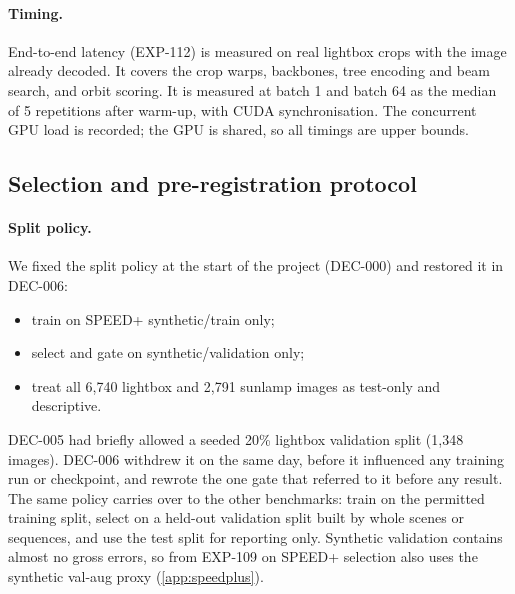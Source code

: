 \paragraph{Timing.}
End-to-end latency (EXP-112) is measured on real lightbox crops with the image already decoded. It covers the crop warps, backbones, tree encoding and beam search, and orbit scoring. It is measured at batch 1 and batch 64 as the median of 5 repetitions after warm-up, with CUDA synchronisation. The concurrent GPU load is recorded; the GPU is shared, so all timings are upper bounds.

\subsection{Selection and pre-registration protocol}\label{app:prereg}

\paragraph{Split policy.}
We fixed the split policy at the start of the project (DEC-000) and restored it in DEC-006:
\begin{itemize}
  \item train on SPEED+ synthetic/train only;
  \item select and gate on synthetic/validation only;
  \item treat all 6{,}740 lightbox and 2{,}791 sunlamp images as test-only and descriptive.
\end{itemize}
DEC-005 had briefly allowed a seeded 20\% lightbox validation split (1{,}348 images). DEC-006 withdrew it on the same day, before it influenced any training run or checkpoint, and rewrote the one gate that referred to it before any result.
The same policy carries over to the other benchmarks: train on the permitted training split, select on a held-out validation split built by whole scenes or sequences, and use the test split for reporting only.
Synthetic validation contains almost no gross errors, so from EXP-109 on SPEED+ selection also uses the synthetic val-aug proxy (\cref{app:speedplus}).


